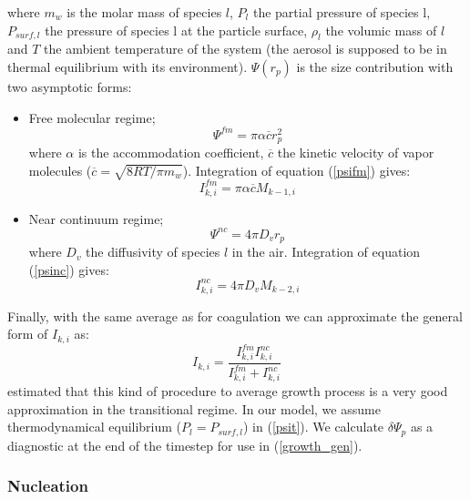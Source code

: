 where $m_w$ is the molar mass of species $l$, $P_l$ the partial pressure of 
species l, $P_{surf,l}$ the pressure of species l at the particle surface,  
$\rho_l$ the volumic mass of $l$ and $T$ the ambient temperature of 
the system (the aerosol is supposed to be in thermal equilibrium with its 
environment).
$\Psi(r_p)$ is the size contribution with two asymptotic forms:
\begin{itemize}
\item Free molecular regime;
\begin{equation}
\Psi^{fm} = \pi \alpha \overline{c} r_p^2
\label{psifm}
\end{equation}
where $\alpha$ is the accommodation coefficient, $\overline{c}$ the kinetic 
velocity of vapor molecules ($\overline{c} = \sqrt{8 RT/\pi m_w}$).
Integration of equation (\ref{psifm}) gives:
\begin{equation}
I^{fm}_{k,i} = \pi \alpha \overline{c} M_{k-1,i}
\label{psifmint}
\end{equation}
\item Near continuum regime;
\begin{equation}
\Psi^{nc} = 4 \pi D_v r_p
\label{psinc}
\end{equation}
where $D_v$ the diffusivity of species $l$ in the air.
Integration of equation (\ref{psinc}) gives:
\begin{equation}
I^{nc}_{k,i} = 4 \pi D_v M_{k-2,i}
\label{psincint}
\end{equation}
\end{itemize}

Finally, with the same average as for coagulation we can approximate the general
form of $I_{k,i}$ as:
\begin{equation}
I_{k,i} = \frac{I^{fm}_{k,i} I^{nc}_{k,i}}{I^{fm}_{k,i} + I^{nc}_{k,i}}
\label{ik_fin}
\end{equation}
\citet{Pratsini1988} estimated that this kind of procedure to average 
growth process is a very good approximation in the transitional regime.
In our model, we assume thermodynamical equilibrium ($P_l = P_{surf,l}$) in (\ref{psit}).
We calculate $\delta \Psi_p$ as a diagnostic at the end of the timestep for use in (\ref{growth_gen}).

\subsubsection*{Nucleation}

